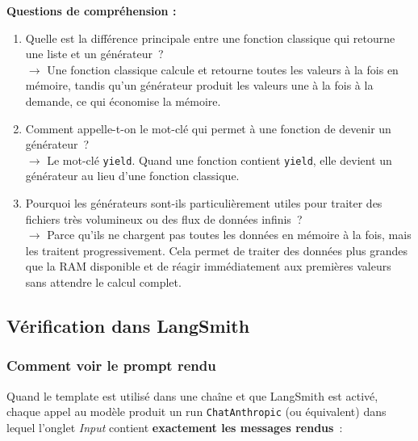 \documentclass[11pt,a4paper]{article}
\begin{document}
\begin{tcolorbox}[
  colback=white,
  colframe=black!50,
  coltitle=black,
  fonttitle=\footnotesize\bfseries,
  fontupper=\footnotesize,
  title=Sortie de l'exécution,
  breakable,
]
\textbf{Questions de compréhension :}

\begin{enumerate}[leftmargin=*, font=\footnotesize\bfseries]
  \item Quelle est la différence principale entre une fonction classique qui
        retourne une liste et un générateur~?\\
        $\rightarrow$ Une fonction classique calcule et retourne toutes les
        valeurs à la fois en mémoire, tandis qu'un générateur produit les
        valeurs une à la fois à la demande, ce qui économise la mémoire.
  \item Comment appelle-t-on le mot-clé qui permet à une fonction de devenir
        un générateur~?\\
        $\rightarrow$ Le mot-clé \texttt{yield}. Quand une fonction contient
        \texttt{yield}, elle devient un générateur au lieu d'une fonction
        classique.
  \item Pourquoi les générateurs sont-ils particulièrement utiles pour
        traiter des fichiers très volumineux ou des flux de données
        infinis~?\\
        $\rightarrow$ Parce qu'ils ne chargent pas toutes les données en
        mémoire à la fois, mais les traitent progressivement. Cela permet de
        traiter des données plus grandes que la RAM disponible et de réagir
        immédiatement aux premières valeurs sans attendre le calcul complet.
\end{enumerate}
\end{tcolorbox}

\subsection{Vérification dans LangSmith}

\subsubsection*{Comment voir le prompt rendu}

Quand le template est utilisé dans une chaîne et que LangSmith est activé,
chaque appel au modèle produit un run \texttt{ChatAnthropic} (ou équivalent)
dans lequel l'onglet \emph{Input} contient \textbf{exactement les messages
rendus}~:

\begin{center}
\end{center}
\end{document}
